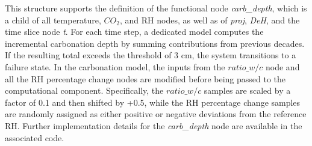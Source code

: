 This structure supports the definition of the functional node \textit{carb\_depth}, which is a child of all temperature, $CO_2$, and RH nodes, as well as of \textit{proj}, \textit{DeH}, and the time slice node \textit{t}. For each time step, a dedicated model computes the incremental carbonation depth by summing contributions from previous decades. If the resulting total exceeds the threshold of 3 cm, the system transitions to a failure state. 
In the carbonation model, the inputs from the $ratio\_w/c$ node and all the RH percentage change nodes are modified before being passed to the computational component. Specifically, the $ratio\_w/c$ samples are scaled by a factor of 0.1 and then shifted by +0.5, while the RH percentage change samples are randomly assigned as either positive or negative deviations from the reference RH.
Further implementation details for the \textit{carb\_depth} node are available in the associated code.
